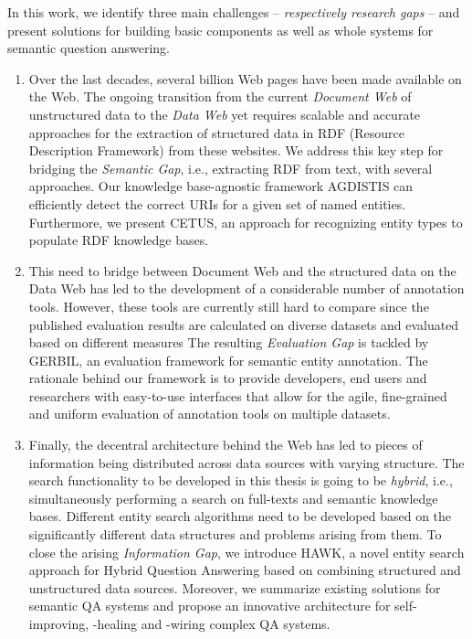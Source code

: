 In this work, we identify three main challenges -- \emph{respectively research gaps} -- and present solutions for building basic components as well as whole systems for semantic question answering.
\begin{enumerate}
\item 
Over the last decades, several billion Web pages have been made available on the Web. 
The ongoing transition from the current \emph{Document Web} of unstructured data to the \emph{Data Web} yet requires scalable and accurate approaches for the extraction of structured data in RDF (Resource Description Framework) from these websites.
We address this key step for bridging the \emph{Semantic Gap}, i.e., extracting RDF from text,  with several approaches.
Our knowledge base-agnostic framework AGDISTIS can efficiently detect the correct URIs for a given set of named entities.
Furthermore, we present CETUS, an approach for recognizing entity types to populate RDF knowledge bases. 
\item 
This need to bridge between Document Web and the structured data on the Data Web has led to the development of a considerable number of annotation tools.
However, these tools are currently still hard to compare since the published evaluation results are calculated on diverse datasets and evaluated based on different measures
The resulting \emph{Evaluation Gap} is tackled by GERBIL, an evaluation framework for semantic entity annotation. The rationale behind our framework is to provide developers, end users and researchers with easy-to-use interfaces that allow for the agile, fine-grained and uniform evaluation of annotation tools on multiple datasets.
\item 
Finally, the decentral architecture behind the Web has led to pieces of information being distributed across data sources with varying structure. 
The search functionality to be developed in this thesis is going to be \emph{hybrid}, i.e., simultaneously performing a search on full-texts and semantic knowledge bases.
Different entity search algorithms need to be developed based on the significantly different data structures and problems arising from them. 
To close the arising \emph{Information Gap}, we introduce HAWK, a novel entity search approach for Hybrid Question Answering based on combining structured and unstructured data sources.
Moreover, we summarize existing solutions for semantic QA systems and propose an innovative architecture for self-improving, -healing and -wiring complex QA systems.
\end{enumerate}

